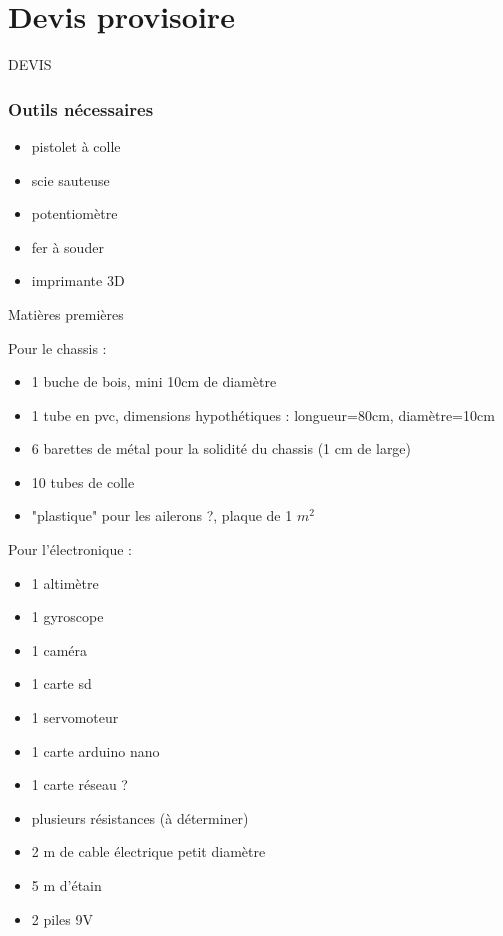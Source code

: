 \documentclass{beamer}
\begin{document}
\section{Devis provisoire}

	\begin{frame}

		\begin{center}

			\Huge DEVIS
		\end{center}
	\end{frame}

	
	\begin{frame}
		
		\frametitle{Outils nécessaires}
		\fontsize{12}{14}\selectfont

		\begin{itemize}

			\item pistolet à colle
			\item scie sauteuse
			\item potentiomètre
			\item fer à souder
			\item imprimante 3D
		\end{itemize}
	\end{frame}

	
	\begin{frame}{Matières premières}

		\fontsize{6}{12}\selectfont
		
		Pour le chassis : 

		\begin{itemize}
			
			\item 1 buche de bois, mini 10cm de diamètre
			\item 1 tube en pvc, dimensions hypothétiques : longueur=80cm, diamètre=10cm
			\item 6 barettes de métal pour la solidité du chassis (1 cm de large)			
			\item 10 tubes de colle
			\item "plastique" pour les ailerons ?, plaque de 1 $m^2$
		\end{itemize}

		
		Pour l'électronique :

		\begin{itemize}

			\item 1 altimètre
			\item 1 gyroscope
			\item 1 caméra
			\item 1 carte sd
			\item 1 servomoteur
			\item 1 carte arduino nano
			\item 1 carte réseau ?
			\item plusieurs résistances (à déterminer)
			\item 2 m de cable électrique petit diamètre
			\item 5 m d'étain
			\item 2 piles 9V
		\end{itemize}

	\end{frame}
\end{document}
